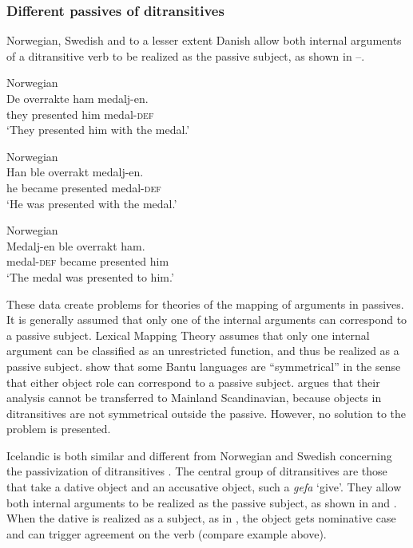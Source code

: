 \documentclass[output=paper,hidelinks]{langscibook}
\begin{document}
\subsubsection{Different passives of ditransitives}

Norwegian, Swedish and to a lesser extent Danish allow both internal arguments of a ditransitive verb to be realized as the passive subject, as shown in --.



\ea\label{ex:Scandinavian:81} Norwegian\\
\gll
 {De} {overrakte} {ham} {medalj-en.}\\
 they presented him medal-\textsc{def}\\
\glt `They presented him with the medal.' \z



\ea\label{ex:Scandinavian:82} Norwegian\\
\gll
 {Han} {ble} {overrakt} {medalj-en.}\\
 he became presented medal-\textsc{def}\\
\glt `He was presented with the medal.' \z



\ea\label{ex:Scandinavian:83} Norwegian\\
\gll
 {Medalj-en} {ble} {overrakt} {ham.}\\
 medal-\textsc{def} became presented him\\
\glt `The medal was presented to him.' \z

\noindent These data create problems for theories of the mapping of arguments in passives. It is generally assumed that only one of the internal arguments can correspond to a passive subject. Lexical Mapping Theory assumes that only one internal argument can be classified as an unrestricted function, and thus be realized as a passive subject. \citet{BresMosh90} show that some Bantu languages are ``symmetrical'' in the sense that either object role can correspond to a passive subject. \citet{Lodrup95} argues that their analysis cannot be transferred to Mainland Scandinavian, because objects in ditransitives are not symmetrical outside the passive. However, no solution to the problem is presented.

 Icelandic is both similar and different from Norwegian and Swedish concerning the passivization of ditransitives \citep{ZMT85:Case}. The central group of ditransitives are those that take a dative object and an accusative object, such a \textit{gefa} `give'. They allow both internal arguments to be realized as the passive subject, as shown in  and . When the dative is realized as a subject, as in , the object gets nominative case and can trigger agreement on the verb (compare example  above).
\end{document}
